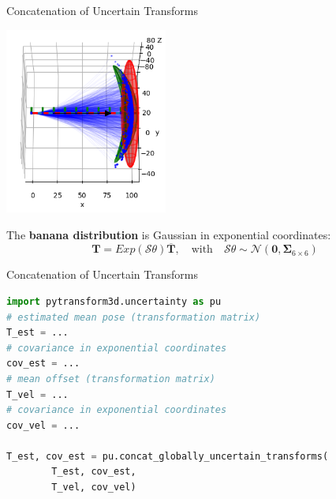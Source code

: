 \documentclass[14pt]{beamer}
\begin{document}
\begin{frame}[fragile]{Concatenation of Uncertain Transforms}
\begin{center}\includegraphics[width=0.4\textwidth]{images/state_estimation}\end{center}
\vskip -0.4cm
The \textbf{banana distribution} is Gaussian in exponential coordinates:
\[
\boldsymbol{T} = Exp(\mathcal{S}\theta) \overline{\boldsymbol{T}},\quad \textrm{with} \quad \mathcal{S}\theta \sim \mathcal{N}\left(\boldsymbol{0}, \boldsymbol{\Sigma}_{6 \times 6}\right)
\]
\end{frame}

\begin{frame}[fragile]{Concatenation of Uncertain Transforms}
\begin{lstlisting}[language=Python]
import pytransform3d.uncertainty as pu
# estimated mean pose (transformation matrix)
T_est = ...
# covariance in exponential coordinates
cov_est = ...
# mean offset (transformation matrix)
T_vel = ...
# covariance in exponential coordinates
cov_vel = ...

T_est, cov_est = pu.concat_globally_uncertain_transforms(
        T_est, cov_est,
        T_vel, cov_vel)
\end{lstlisting}
\end{frame}
\end{document}

